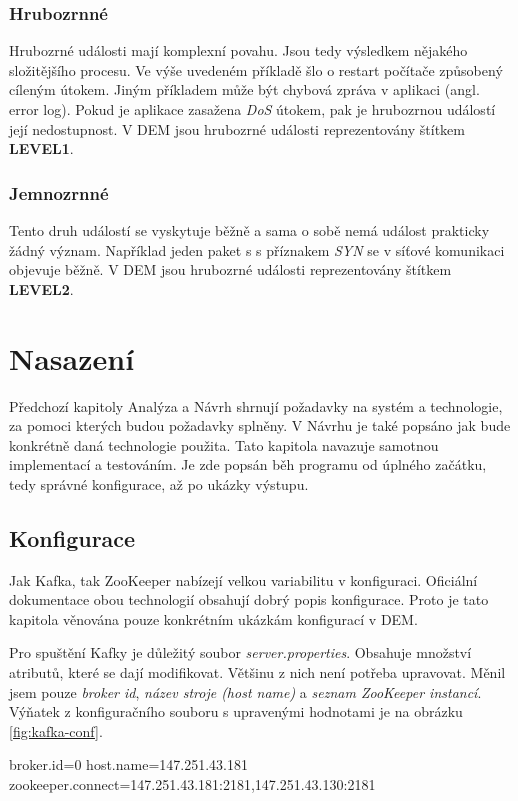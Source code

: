 \documentclass[
  digital, %
  table,   %
  nolof,     %
  nolot,     %
  oneside, %
  nocover,
  monochrome,
  12pt
]{fithesis3}
\begin{document}
\subsection*{Hrubozrnné}
Hrubozrné události mají komplexní povahu. Jsou tedy výsledkem nějakého složitějšího procesu. Ve výše uvedeném příkladě šlo o restart počítače způsobený cíleným útokem. Jiným příkladem může být chybová zpráva v aplikaci (angl. error log). Pokud je aplikace zasažena \textit{DoS} útokem, pak je hrubozrnou událostí její nedostupnost. V DEM jsou hrubozrné události reprezentovány štítkem \textbf{LEVEL1}.
 
\subsection*{Jemnozrnné}
Tento druh událostí se vyskytuje běžně a sama o sobě nemá událost prakticky žádný význam. Například jeden paket s s příznakem \textit{SYN} se v síťové komunikaci objevuje běžně. V DEM jsou hrubozrné události reprezentovány štítkem \textbf{LEVEL2}.

\chapter{Nasazení}
Předchozí kapitoly Analýza a Návrh shrnují požadavky na systém a technologie, za pomoci kterých budou požadavky splněny. V Návrhu je také popsáno jak bude konkrétně daná technologie použita. Tato kapitola navazuje samotnou implementací a testováním. Je zde popsán běh programu od úplného začátku, tedy správné konfigurace, až po ukázky výstupu. 

\section{Konfigurace}
Jak Kafka, tak ZooKeeper nabízejí velkou variabilitu v konfiguraci. Oficiální dokumentace obou technologií obsahují dobrý popis konfigurace. Proto je tato kapitola věnována pouze konkrétním ukázkám konfigurací v DEM.

Pro spuštění Kafky je důležitý soubor \textit{server.properties}. Obsahuje množství atributů, které se dají modifikovat. Většinu z nich není potřeba upravovat. Měnil jsem pouze \textit{broker id}, \textit{název stroje (host name)} a \textit{seznam ZooKeeper instancí}. Výňatek z konfiguračního souboru s upravenými hodnotami je na obrázku \ref{fig:kafka-conf}.

\begin{center}
\begin{minipage}[H]{\linewidth}
	\begin{mylisting}
broker.id=0
host.name=147.251.43.181
zookeeper.connect=147.251.43.181:2181,147.251.43.130:2181
	\end{mylisting}
	\label{fig:kafka-conf} 
\end{minipage}
\end{center}
\end{document}
